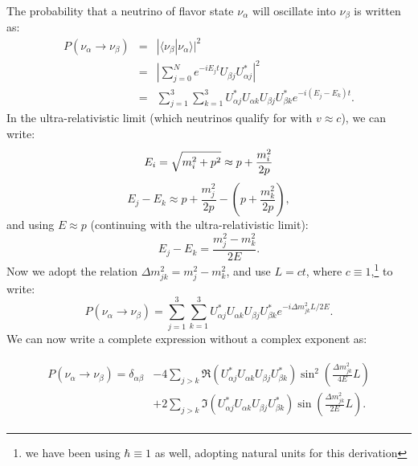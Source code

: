 \documentclass[aps,prd,twocolumn,nofootinbib]{revtex4-1}
\begin{document}
The probability that a neutrino of flavor state $\nu_{\alpha}$ will oscillate into $\nu_{\beta}$ is written as:
\begin{eqnarray}
  P(\nu_{\alpha}\rightarrow\nu_{\beta}) &=& |\langle\nu_{\beta}|\nu_{\alpha}\rangle|^2 \nonumber \\
                                        &=& \left|\sum_{j=0}^Ne^{-iE_jt}U_{\beta j}U_{\alpha j}^*\right|^2 \nonumber \\
                                        &=& \sum_{j=1}^3\sum_{k=1}^3U_{\alpha j}^*U_{\alpha k}U_{\beta j}U_{\beta k}^*e^{-i(E_j-E_k)t}.
\end{eqnarray}
In the ultra-relativistic limit (which neutrinos qualify for with $v \approx c$), we can write:
\begin{equation}
  E_i = \sqrt{m_i^2+p^2} \approx p + \frac{m_i^2}{2p} \\
  \label{eq:approx1}
\end{equation}
\begin{equation}
  E_j - E_k \approx p + \frac{m_j^2}{2p} - \left(p + \frac{m_k^2}{2p}\right),
  \label{eq:approx2}
\end{equation}
and using $E \approx p$ (continuing with the ultra-relativistic limit):
\begin{equation}
  E_j - E_k = \frac{m_j^2 - m_k^2}{2E}.
  \label{eq:approx3}
\end{equation}
Now we adopt the relation $\Delta m_{jk}^2 = m_j^2 - m_k^2$, and use $L = ct$, where $c\equiv1$,\footnote{we have been using $\hbar \equiv 1$ as well, adopting natural units for this derivation} to write:
\begin{equation}
  P(\nu_{\alpha}\rightarrow\nu_{\beta}) = \sum_{j=1}^3\sum_{k=1}^3U_{\alpha j}^*U_{\alpha k}U_{\beta j}U_{\beta k}^*e^{-i\Delta m_{jk}^2L/2E}.
\end{equation}
We can now write a complete expression without a complex exponent as:
\begin{widetext}
  \begin{align}
    \begin{split}
      P(\nu_{\alpha}\rightarrow\nu_{\beta}) = \delta_{\alpha\beta} & - 4\sum_{j>k}\Re\left(U_{\alpha j}^*U_{\alpha k}U_{\beta j}U_{\beta k}^*\right)\sin^2\left(\frac{\Delta m_{jk}^2}{4E}L\right) \\
      & + 2\sum_{j>k}\Im\left(U_{\alpha j}^*U_{\alpha k}U_{\beta j}U_{\beta k}^*\right)\sin\left(\frac{\Delta m_{jk}^2}{2E}L\right).
    \end{split}
  \end{align}
\end{widetext}
\end{document}
